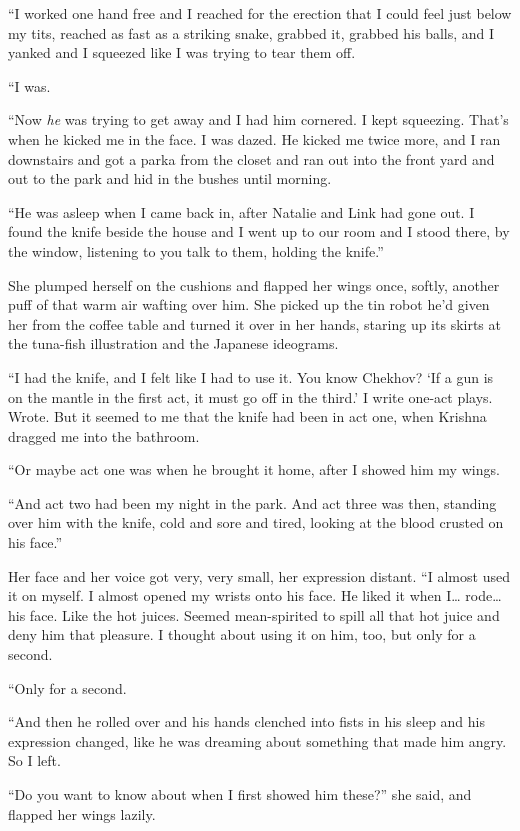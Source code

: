 ``I worked one hand free and I reached for the erection that I could
feel just below my tits, reached as fast as a striking snake, grabbed
it, grabbed his balls, and I yanked and I squeezed like I was trying
to tear them off.

``I was.

``Now \textit{he} was trying to get away and I had him cornered.  I
kept squeezing.  That's when he kicked me in the face.  I was dazed. 
He kicked me twice more, and I ran downstairs and got a parka from the
closet and ran out into the front yard and out to the park and hid in
the bushes until morning.

``He was asleep when I came back in, after Natalie and Link had gone
out.  I found the knife beside the house and I went up to our room and
I stood there, by the window, listening to you talk to them, holding
the knife.''

She plumped herself on the cushions and flapped her wings once,
softly, another puff of that warm air wafting over him.  She picked up
the tin robot he'd given her from the coffee table and turned it over
in her hands, staring up its skirts at the tuna-fish illustration and
the Japanese ideograms.

``I had the knife, and I felt like I had to use it.  You know Chekhov? 
`If a gun is on the mantle in the first act, it must go off in the
third.' I write one-act plays.  Wrote.  But it seemed to me that the
knife had been in act one, when Krishna dragged me into the bathroom.

``Or maybe act one was when he brought it home, after I showed him my
wings.

``And act two had been my night in the park.  And act three was then,
standing over him with the knife, cold and sore and tired, looking at
the blood crusted on his face.''

Her face and her voice got very, very small, her expression distant. 
``I almost used it on myself.  I almost opened my wrists onto his
face.  He liked it when I\ldots{}  rode\ldots{}  his face.  Like the hot juices. 
Seemed mean-spirited to spill all that hot juice and deny him that
pleasure.  I thought about using it on him, too, but only for a
second.

``Only for a second.

``And then he rolled over and his hands clenched into fists in his
sleep and his expression changed, like he was dreaming about something
that made him angry.  So I left.

``Do you want to know about when I first showed him these?'' she said,
and flapped her wings lazily.

